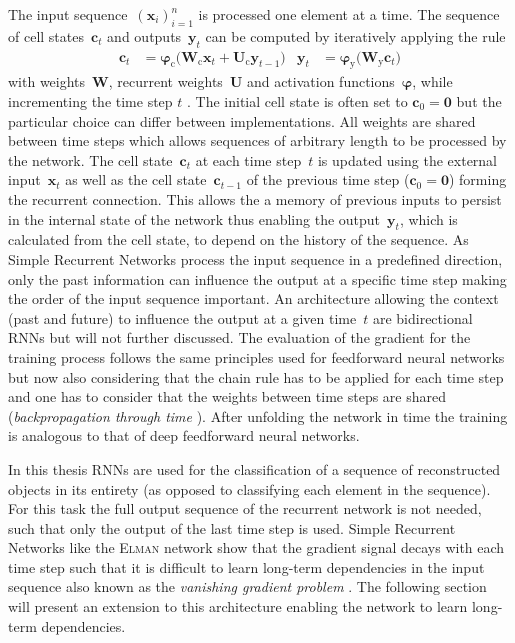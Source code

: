 The input sequence~$\left( \mathbf{x}_i \right)_{i=1}^n$ is processed one
element at a time. The sequence of cell states~$\mathbf{c}_t$ and
outputs~$\mathbf{y}_t$ can be computed by iteratively applying the rule
\begin{align*}
  \mathbf{c}_t &= \bm{\varphi}_{\text{c}}\Big( \mathbf{W}_{\text{c}} \mathbf{x}_{t} + \mathbf{U}_{\text{c}} \mathbf{y}_{t-1} \Big)
  &\mathbf{y}_t &= \bm{\varphi}_{\text{y}}\Big( \mathbf{W}_{\text{y}} \mathbf{c}_{t} \Big)
\end{align*}
with weights~$\mathbf{W}$, recurrent weights~$\mathbf{U}$ and activation
functions~$\bm{\varphi}$, while incrementing the time step $t$ \cite{elman,
  graves}. The initial cell state is often set to $\mathbf{c}_0 = \mathbf{0}$
but the particular choice can differ between implementations. All weights are
shared between time steps which allows sequences of arbitrary length to be
processed by the network. The cell state~$\mathbf{c}_t$ at each time step~$t$ is
updated using the external input~$\mathbf{x}_t$ as well as the cell
state~$\mathbf{c}_{t-1}$ of the previous time step ($\mathbf{c}_0 = \mathbf{0}$)
forming the recurrent connection. This allows the a memory of previous inputs to
persist in the internal state of the network thus enabling the
output~$\mathbf{y}_t$, which is calculated from the cell state, to depend on the
history of the sequence. As Simple Recurrent Networks process the input
sequence in a predefined direction, only the past information can influence the
output at a specific time step making the order of the input sequence important.
An architecture allowing the context (past and future) to influence the output
at a given time~$t$ are bidirectional RNNs but will not further discussed. The
evaluation of the gradient for the training process follows the same principles
used for feedforward neural networks but now also considering that the chain
rule has to be applied for each time step and one has to consider that the
weights between time steps are shared (\emph{backpropagation through time}
\cite{williams_zipser}). After unfolding the network in time the training is
analogous to that of deep feedforward neural networks.

In this thesis RNNs are used for the classification of a sequence of
reconstructed objects in its entirety (as opposed to classifying each element in
the sequence). For this task the full output sequence of the recurrent network
is not needed, such that only the output of the last time step is used. Simple
Recurrent Networks like the \textsc{Elman} network show that the gradient signal
decays with each time step such that it is difficult to learn long-term
dependencies in the input sequence also known as the \emph{vanishing gradient
  problem} \cite{hochreiter, lecun_bengio_hinton_DL} . The following section will present an extension to this
architecture enabling the network to learn long-term dependencies.

